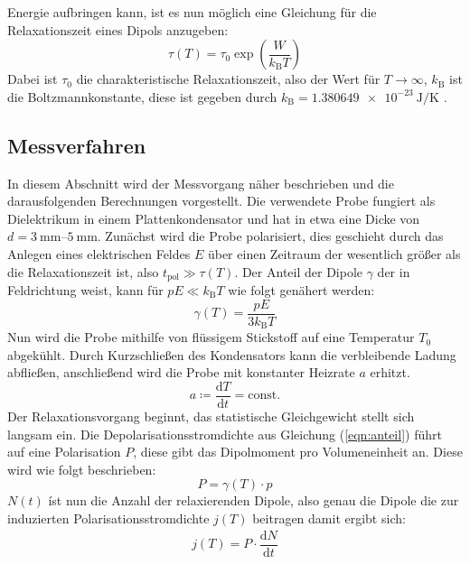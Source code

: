 Energie aufbringen kann, ist es nun möglich eine Gleichung für die Relaxationszeit eines Dipols anzugeben:
\begin{equation}
  \label{eqn:relax}
  \tau(T)=\tau_\mathrm{0}\exp\left(\dfrac{W}{k_\mathrm{B}T}\right)
\end{equation}
Dabei ist $\tau_\mathrm{0}$ die charakteristische Relaxationszeit, also der Wert für $T\rightarrow\infty$, $k_\mathrm{B}$ ist die Boltzmannkonstante, diese ist gegeben durch $k_\mathrm{B}=\SI{1.380649e-23}{\joule\per\kelvin}$ \cite{Anleitung7}.
\subsection{Messverfahren}
\label{sec:messv}
In diesem Abschnitt wird der Messvorgang näher beschrieben und die darausfolgenden Berechnungen vorgestellt. Die verwendete Probe fungiert als Dielektrikum in einem Plattenkondensator und hat in etwa eine Dicke von $d=\SIrange{3}{5}{\milli\meter}$. Zunächst wird die Probe polarisiert, dies geschieht durch das Anlegen eines elektrischen Feldes $E$ über einen Zeitraum der wesentlich größer als die Relaxationszeit ist, also $t_\mathrm{pol}\gg\tau(T)$.
Der Anteil der Dipole $\gamma$ der in Feldrichtung weist, kann für $pE\ll k_\mathrm{B}T$ wie folgt genähert werden:
\begin{equation}
  \label{eqn:anteil}
  \gamma(T)=\dfrac{pE}{3k_\mathrm{B}T}
\end{equation}
Nun wird die Probe mithilfe von flüssigem Stickstoff auf eine Temperatur $T_\mathrm{0}$ abgekühlt. Durch Kurzschließen des Kondensators kann die verbleibende Ladung abfließen,
anschließend wird die Probe mit konstanter Heizrate $a$ erhitzt.
\begin{equation}
  a\coloneqq\dfrac{\mathrm{d} T}{\mathrm{d} t}= \mathrm{const.}
\end{equation}
Der Relaxationsvorgang beginnt, das statistische Gleichgewicht stellt sich langsam ein. Die Depolarisationsstromdichte aus Gleichung (\ref{eqn:anteil}) führt auf eine Polarisation $P$, diese gibt das Dipolmoment pro Volumeneinheit an.
Diese wird wie folgt beschrieben:
\begin{equation}
  \label{eqn:pola}
  P=\gamma(T)\cdot p
\end{equation}
$N(t)$ íst nun die Anzahl der relaxierenden Dipole, also genau die Dipole die zur induzierten Polarisationsstromdichte $j(T)$ beitragen damit ergibt sich:
\begin{align*}
  j(T)=P\cdot\dfrac{\mathrm{d} N}{\mathrm{d} t}
\end{align*}
